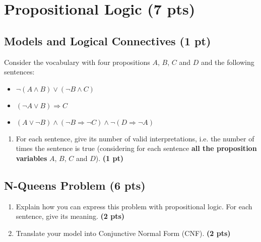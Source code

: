 \documentclass[11pt,a4paper]{report}
\begin{document}
\section{Propositional Logic (7 pts)}

\subsection{Models and Logical Connectives (1 pt)}
Consider the vocabulary with four propositions $A$, $B$, $C$ and $D$ and the
following sentences:
\begin{itemize}
\item $\neg ( A \land B) \lor (\neg B \land C)$
\item $(\neg A \lor B) \Rightarrow C$
\item $( A \lor \neg B) \land (\neg B \Rightarrow \neg C) \land \neg (D \Rightarrow \neg A)$
\end{itemize}

\begin{enumerate}
  \item For each sentence, give its number of valid interpretations, i.e. the number of times the sentence is true (considering for each sentence {\bf all the proposition variables} $A$, $B$, $C$ and $D$). \textbf{(1 pt)}
\end{enumerate}

\begin{answer}
\end{answer}



\subsection{N-Queens Problem (6 pts)}

\begin{enumerate}
\item Explain how you can express this problem with propositional logic. For each sentence, give its meaning. \textbf{(2 pts)}
\end{enumerate}

\begin{answers}[10cm]
\end{answers}



\begin{enumerate}
\setcounter{enumi}{1}
\item Translate your model into Conjunctive Normal Form (CNF). \textbf{(2 pts)}
\end{enumerate}
\end{document}
